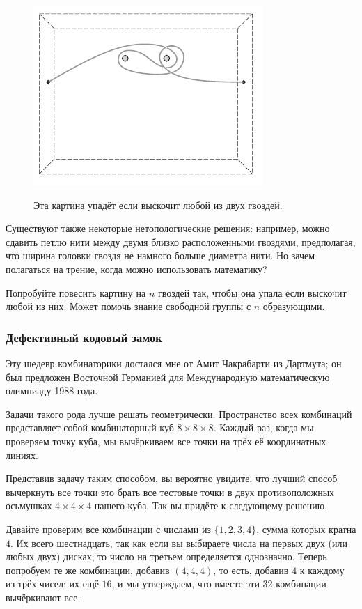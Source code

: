 \begin{figure}[h!]
\centering
\includegraphics[scale=1]{pics/kartina2}
\label{pic:kartina2}
\caption{Эта картина упадёт если выскочит любой из двух гвоздей.}
\end{figure}

Существуют также некоторые нетопологические решения: например, можно сдавить петлю нити между двумя близко расположенными гвоздями, предполагая, что ширина головки гвоздя не намного больше диаметра нити.
Но зачем полагаться на трение, когда можно использовать математику?

\begin{addedbytheeditors}
Попробуйте повесить картину на $n$ гвоздей так, чтобы она упала если выскочит любой из них.
Может помочь знание свободной группы с $n$ образующими.
\end{addedbytheeditors}

\subsubsection*{Дефективный кодовый замок}

Эту шедевр комбинаторики достался мне от Амит Чакрабарти из Дартмута;
он был предложен Восточной Германией для Международную математическую олимпиаду 1988 года.

Задачи такого рода лучше решать геометрически.
Пространство всех комбинаций представляет собой комбинаторный куб $8 \times 8 \times 8$.
Каждый раз, когда мы проверяем точку куба, мы вычёркиваем все точки на трёх её координатных линиях.

Представив задачу таким способом, вы вероятно увидите, что лучший способ вычеркнуть все точки это брать все тестовые точки в двух противоположных осьмушках $4 \times 4 \times 4$ нашего куба.
Так вы придёте к следующему решению.

Давайте проверим все комбинации с числами из $\{1, 2, 3, 4\}$, сумма которых кратна $4$.
Их всего шестнадцать, так как если вы выбираете числа на первых двух (или любых двух) дисках, то число на третьем определяется однозначно.
Теперь попробуем те же комбинации, добавив $(4,4,4)$, то есть, добавив $4$ к каждому из трёх чисел;
их ещё $16$, и мы утверждаем, что вместе эти $32$ комбинации вычёркивают все.

